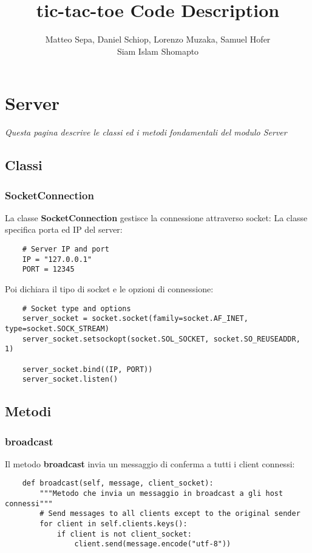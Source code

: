 \documentclass{article}
\title{tic-tac-toe Code Description}
\date{}
\author{Matteo Sepa, Daniel Schiop, Lorenzo Muzaka, Samuel Hofer \\ Siam Islam Shomapto}
\begin{document}
\maketitle
{}

\newpage
\tableofcontents
\newpage
{}

\section{Server}
\emph{Questa pagina descrive le classi ed i metodi fondamentali del modulo Server}

\subsection{Classi}
\subsubsection{SocketConnection}
La classe \textbf{SocketConnection} gestisce la connessione attraverso socket:\newline\newline
La classe specifica porta ed IP del server:

\begin{verbatim}
    # Server IP and port
    IP = "127.0.0.1"
    PORT = 12345
\end{verbatim}
Poi dichiara il tipo di socket e le opzioni di connessione:

\begin{verbatim}
    # Socket type and options
    server_socket = socket.socket(family=socket.AF_INET, type=socket.SOCK_STREAM)
    server_socket.setsockopt(socket.SOL_SOCKET, socket.SO_REUSEADDR, 1)

    server_socket.bind((IP, PORT))
    server_socket.listen()
\end{verbatim}

\newpage
\subsection{Metodi}

\subsubsection{broadcast}
Il metodo \textbf{broadcast} invia un messaggio di conferma a tutti i client connessi:

\begin{verbatim}
    def broadcast(self, message, client_socket):
        """Metodo che invia un messaggio in broadcast a gli host connessi"""
        # Send messages to all clients except to the original sender
        for client in self.clients.keys():
            if client is not client_socket:
                client.send(message.encode("utf-8"))
\end{verbatim}
\end{document}
